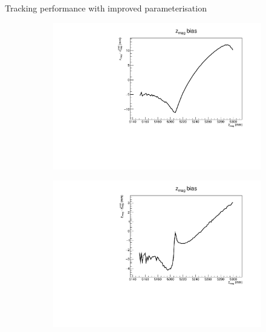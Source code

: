 \documentclass[xcolor={dvipsnames}]{beamer}
\begin{document}
\begin{frame}{Tracking performance with improved parameterisation}
  \vspace{0.0cm}
  \begin{figure}[htb]
    \centering
    \begin{subfigure}{0.4\textwidth}
      \includegraphics[width=1\textwidth]{Plots/z_mag_position_bias_new_parameterisation.pdf}
    \end{subfigure}%
    \begin{subfigure}{0.4\textwidth}
      \includegraphics[width=1\textwidth]{Plots/z_mag_position_bias_new_parameterisation_7.pdf}
    \end{subfigure}
    \begin{subfigure}{0.4\textwidth}

\end{subfigure}
\end{figure}
\end{frame}
\end{document}

